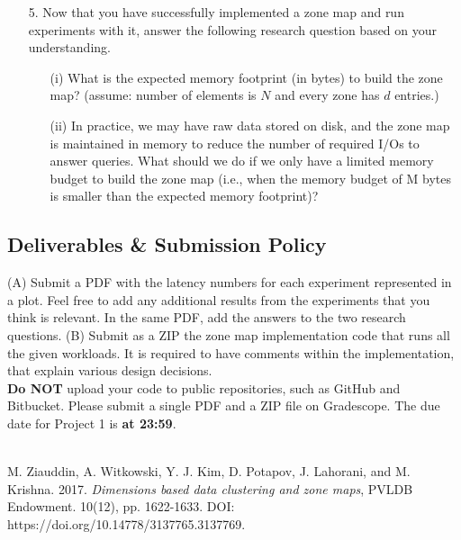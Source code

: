 \documentclass[12pt,a4paper,twoside]{article}
\newcommand{\assignmenttype}{Project}       %
\newcommand{\assignmentnumber}{1}           %
\begin{document}
\begin{enumerate}
    \item[5.] Now that you have successfully implemented a zone map and run experiments with it, answer the following research question based on your understanding. \begin{enumerate}
        \item[(i)] What is the expected memory footprint (in bytes) to build the zone map? (assume: number of elements is $N$ and every zone has $d$ entries.) 
        \item[(ii)] In practice, we may have raw data stored on disk, and the zone map is maintained in memory to reduce the number of required I/Os to answer queries. What should we do if we only have a limited memory budget to build the zone map (i.e., when the memory budget of M bytes is smaller than the expected memory footprint)? 
    \end{enumerate}
\end{enumerate}

\subsection*{Deliverables \& Submission Policy} 
(A) Submit a PDF with the latency numbers for each experiment represented in a plot. 
Feel free to add any additional results from the experiments that you think is relevant. 
In the same PDF, add the answers to the two research questions. 
(B) Submit as a ZIP the zone map implementation code that runs all the given workloads. 
It is required to have comments within the implementation, that explain various design decisions. \\ 

\noindent \textbf{Do NOT} upload your code to public repositories, such as GitHub and Bitbucket. 
Please submit a single PDF and a ZIP file on Gradescope. 
The due date for \assignmenttype{} \assignmentnumber{} is \textbf{ at 23:59}. \\\\



\begin{thebibliography}{9}
M. Ziauddin, A. Witkowski, Y. J. Kim, D. Potapov, J. Lahorani, and M. Krishna. 2017. \emph{Dimensions based data clustering and zone maps}, PVLDB Endowment. 10(12), pp. 1622-1633. DOI: https://doi.org/10.14778/3137765.3137769.
\end{thebibliography}
\end{document}
